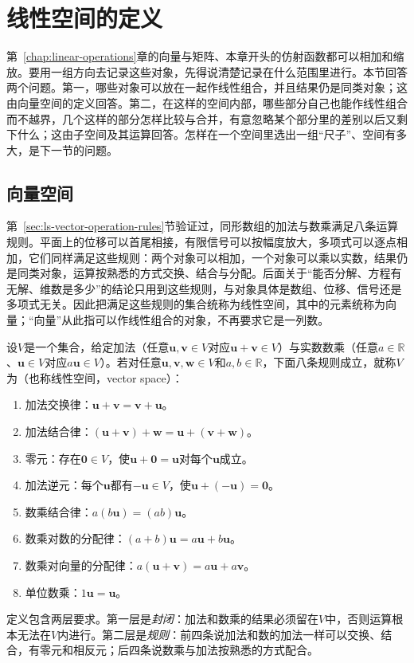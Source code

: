 
\section{线性空间的定义}
\label{sec:ls-vector-spaces}
\label{sec:linear-algebra-vector-spaces-coordinates}

第~\ref{chap:linear-operations}章的向量与矩阵、本章开头的仿射函数都可以相加和缩放。要用一组方向去记录这些对象，先得说清楚记录在什么范围里进行。本节回答两个问题。第一，哪些对象可以放在一起作线性组合，并且结果仍是同类对象；这由向量空间的定义回答。第二，在这样的空间内部，哪些部分自己也能作线性组合而不越界，几个这样的部分怎样比较与合并，有意忽略某个部分里的差别以后又剩下什么；这由子空间及其运算回答。怎样在一个空间里选出一组“尺子”、空间有多大，是下一节的问题。

\subsection{向量空间}
\label{sec:ls-space-axioms}

第~\ref{sec:ls-vector-operation-rules}节验证过，同形数组的加法与数乘满足八条运算规则。平面上的位移可以首尾相接，有限信号可以按幅度放大，多项式可以逐点相加，它们同样满足这些规则：两个对象可以相加，一个对象可以乘以实数，结果仍是同类对象，运算按熟悉的方式交换、结合与分配。后面关于“能否分解、方程有无解、维数是多少”的结论只用到这些规则，与对象具体是数组、位移、信号还是多项式无关。因此把满足这些规则的集合统称为线性空间，其中的元素统称为向量；“向量”从此指可以作线性组合的对象，不再要求它是一列数。

\begin{definition}[实线性空间]
\label{def:ls-real-vector-space}
设$V$是一个集合，给定加法（任意$\bm u,\bm v\in V$对应$\bm u+\bm v\in V$）与实数数乘（任意$a\in\mathbb R$、$\bm u\in V$对应$a\bm u\in V$）。若对任意$\bm u,\bm v,\bm w\in V$和$a,b\in\mathbb R$，下面八条规则成立，就称$V$为（也称线性空间，vector space）：
\begin{enumerate}
 \item 加法交换律：$\bm u+\bm v=\bm v+\bm u$。
 \item 加法结合律：$(\bm u+\bm v)+\bm w=\bm u+(\bm v+\bm w)$。
 \item 零元：存在$\bm0\in V$，使$\bm u+\bm0=\bm u$对每个$\bm u$成立。
 \item 加法逆元：每个$\bm u$都有$-\bm u\in V$，使$\bm u+(-\bm u)=\bm0$。
 \item 数乘结合律：$a(b\bm u)=(ab)\bm u$。
 \item 数乘对数的分配律：$(a+b)\bm u=a\bm u+b\bm u$。
 \item 数乘对向量的分配律：$a(\bm u+\bm v)=a\bm u+a\bm v$。
 \item 单位数乘：$1\bm u=\bm u$。
\end{enumerate}
\end{definition}
定义包含两层要求。第一层是\emph{封闭}：加法和数乘的结果必须留在$V$中，否则运算根本无法在$V$内进行。第二层是\emph{规则}：前四条说加法和数的加法一样可以交换、结合，有零元和相反元；后四条说数乘与加法按熟悉的方式配合。

